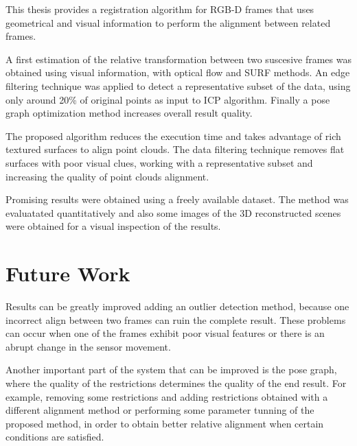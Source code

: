 

This thesis provides a registration algorithm for RGB-D frames that uses geometrical and visual information 
to perform the alignment between related frames.  

A first estimation of the relative transformation between two suscesive frames was obtained using 
visual information, with optical flow and SURF methods. An edge filtering technique was applied to detect a representative subset 
of the data, using only around 20\% of original points as input to ICP algorithm. Finally a pose graph optimization method increases overall result quality.

The proposed algorithm reduces the execution time and takes advantage of rich textured surfaces to align point clouds. The data filtering technique removes flat surfaces with poor visual clues, working with a representative subset and increasing the quality of point clouds alignment.


Promising results were obtained using a freely available dataset. The method was evaluatated quantitatively and 
also some images of the 3D reconstructed scenes were obtained for a visual inspection of the results.

\section{Future Work}

  Results can be greatly improved adding an outlier detection method, because one incorrect align between two frames can ruin the complete result. These problems can occur 
when one of the frames exhibit poor visual features or there is an abrupt change in the sensor movement. 

  Another important part of the system that can be improved is the pose graph, where the quality of the restrictions 
determines the quality of the end result. For example, removing some restrictions and adding restrictions obtained with a 
different alignment method or performing some parameter tunning of the proposed method, in 
order to obtain better relative alignment when certain conditions are satisfied.

